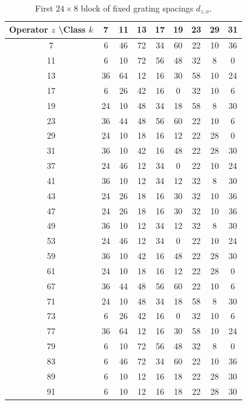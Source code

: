 \documentclass[11pt,a4paper]{article}
\begin{document}
\begin{table}[htbp]
\centering
\tiny
\begin{tabular}{c|cccccccc}
Operator \(z\) \textbackslash Class \(k\) & 7 & 11 & 13 & 17 & 19 & 23 & 29 & 31 \\
\hline
7  & 6 & 46 & 72 & 34 & 60 & 22 & 10 & 36 \\
11 & 6 & 10 & 72 & 56 & 48 & 32 & 8 & 0 \\
13 & 36 & 64 & 12 & 16 & 30 & 58 & 10 & 24 \\
17 & 6 & 26 & 42 & 16 & 0 & 32 & 10 & 6 \\
19 & 24 & 10 & 48 & 34 & 18 & 58 & 8 & 30 \\
23 & 36 & 44 & 48 & 56 & 60 & 22 & 10 & 6 \\
29 & 24 & 10 & 18 & 16 & 12 & 22 & 28 & 0 \\
31 & 36 & 10 & 42 & 16 & 48 & 22 & 28 & 30 \\
37 & 24 & 46 & 12 & 34 & 0 & 22 & 10 & 24 \\
41 & 36 & 10 & 12 & 34 & 12 & 32 & 8 & 30 \\
43 & 24 & 26 & 18 & 16 & 30 & 32 & 10 & 36 \\
47 & 24 & 26 & 18 & 16 & 30 & 32 & 10 & 36 \\
49 & 36 & 10 & 12 & 34 & 12 & 32 & 8 & 30 \\
53 & 24 & 46 & 12 & 34 & 0 & 22 & 10 & 24 \\
59 & 36 & 10 & 42 & 16 & 48 & 22 & 28 & 30 \\
61 & 24 & 10 & 18 & 16 & 12 & 22 & 28 & 0 \\
67 & 36 & 44 & 48 & 56 & 60 & 22 & 10 & 6 \\
71 & 24 & 10 & 48 & 34 & 18 & 58 & 8 & 30 \\
73 & 6 & 26 & 42 & 16 & 0 & 32 & 10 & 6 \\
77 & 36 & 64 & 12 & 16 & 30 & 58 & 10 & 24 \\
79 & 6 & 10 & 72 & 56 & 48 & 32 & 8 & 0 \\
83 & 6 & 46 & 72 & 34 & 60 & 22 & 10 & 36 \\
89 & 6 & 10 & 12 & 16 & 18 & 22 & 28 & 30 \\
91 & 6 & 10 & 12 & 16 & 18 & 22 & 28 & 30 \\
\end{tabular}
\caption{First \(24 \times 8\) block of fixed grating spacings \(d_{z,o}\).}
\label{tab:d-block1}
\end{table}
\end{document}
